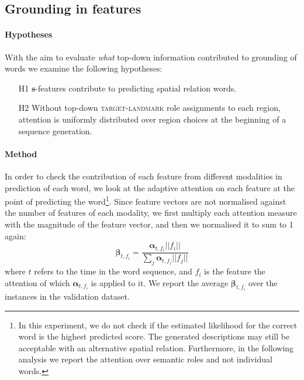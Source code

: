 \subsection{Grounding in features}
\paragraph{Hypotheses}
With the aim to evaluate \emph{what} top-down information contributed
to grounding of words we examine the following hypotheses:
\begin{itemize}[noitemsep]
\item[H1] $\bm{s}$-features contribute to predicting spatial relation
  words.
\item[H2] Without top-down \textsc{target}-\textsc{landmark} %
  role assignments to
  each region, 
  attention is uniformly distributed over region choices
  at the beginning of a sequence
  generation.


\end{itemize}


\paragraph{Method}
In order to check the contribution of each feature from different
modalities %
in prediction of each word, we look at the adaptive attention on each
feature at the point of predicting the word\footnote{
In this experiment, we do not check if the estimated likelihood for the correct word is the highest predicted score. 
The generated descriptions may still be acceptable with an alternative spatial relation. Furthermore, in the following analysis we report the attention over semantic roles and not individual words.
}.  Since feature vectors
are not normalised against the number of features of each modality, we
first multiply each attention measure with the magnitude of the
feature vector, and then we normalised it to sum to 1 again:
\begin{equation}\label{inlg2019:eq:nomalised_attention}
\bm{\beta}_{t,f_i} = \frac{\bm{\alpha}_{t,f_i} ||f_i||}{\sum_{j}{\bm{\alpha}_{t,f_j} ||f_j||}}
\end{equation}
\noindent where $t$ refers to the time in the word sequence, and $f_i$
is the feature the attention of which $\bm{\alpha}_{t,f_i}$ is applied
to it. We report the average $\bm{\beta}_{t,f_i}$ over the instances
in the validation dataset.

